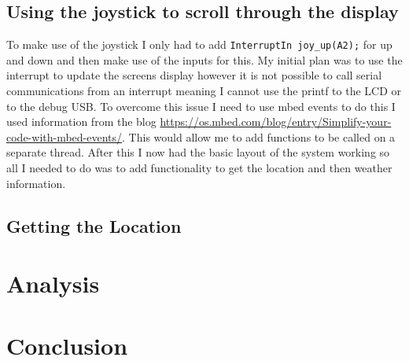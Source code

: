 \documentclass[a4paper,12pt]{scrartcl}
\begin{document}
{		\subsection{Using the joystick to scroll through the display}
		{
			To make use of the joystick I only had to add \lstinline|InterruptIn joy_up(A2);| for up and down and then make use of the inputs for this. My initial plan was to use the interrupt to update the screens display however it is not possible to call serial communications from an interrupt meaning I cannot use the printf to the LCD or to the debug USB. To overcome this issue I need to use mbed events to do this I used information from the blog \url{https://os.mbed.com/blog/entry/Simplify-your-code-with-mbed-events/}\cite{Jongboom2018}. This would allow me to add functions to be called on a separate thread. After this I now had the basic layout of the system working so all I needed to do was to add functionality to get the location and then weather information.
		}
		\subsection{Getting the Location}
		{
		
		}
	}
	
	\section{Analysis}
	{
	
	}
	
	\section{Conclusion}
	{
		
	}
	
	\newpage
	
	\printbibliography[heading=bibintoc,title=References]
\end{document}
